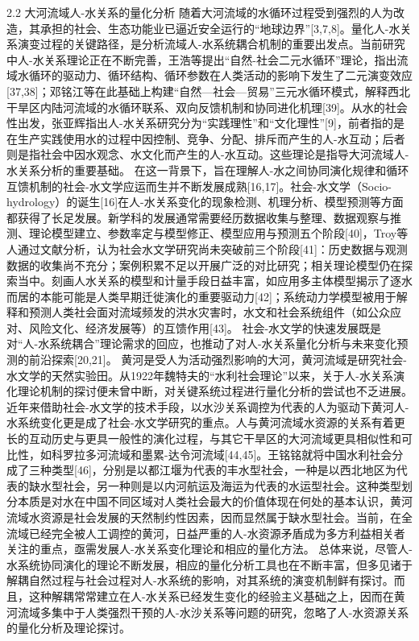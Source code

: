 2.2 大河流域人-水关系的量化分析
随着大河流域的水循环过程受到强烈的人为改造，其承担的社会、生态功能业已逼近安全运行的“地球边界”[3,7,8]。量化人-水关系演变过程的关键路径，是分析流域人-水系统耦合机制的重要出发点。当前研究中人-水关系理论正在不断完善，王浩等提出“自然-社会二元水循环”理论，指出流域水循环的驱动力、循环结构、循环参数在人类活动的影响下发生了二元演变效应[37,38]；邓铭江等在此基础上构建“自然—社会—贸易”三元水循环模式，解释西北干旱区内陆河流域的水循环联系、双向反馈机制和协同进化机理[39]。从水的社会性出发，张亚辉指出人-水关系研究分为“实践理性”和“文化理性”[9]，前者指的是在生产实践使用水的过程中因控制、竞争、分配、排斥而产生的人-水互动；后者则是指社会中因水观念、水文化而产生的人-水互动。这些理论是指导大河流域人-水关系分析的重要基础。
在这一背景下，旨在理解人-水之间协同演化规律和循环互馈机制的社会-水文学应运而生并不断发展成熟[16,17]。社会-水文学（Socio-hydrology）的诞生[16]在人-水关系变化的现象检测、机理分析、模型预测等方面都获得了长足发展。新学科的发展通常需要经历数据收集与整理、数据观察与推测、理论模型建立、参数率定与模型修正、模型应用与预测五个阶段[40]，Troy等人通过文献分析，认为社会水文学研究尚未突破前三个阶段[41]：历史数据与观测数据的收集尚不充分；案例积累不足以开展广泛的对比研究；相关理论模型仍在探索当中。刻画人水关系的模型和计量手段日益丰富，如应用多主体模型揭示了逐水而居的本能可能是人类早期迁徙演化的重要驱动力[42]；系统动力学模型被用于解释和预测人类社会面对流域频发的洪水灾害时，水文和社会系统组件（如公众应对、风险文化、经济发展等）的互馈作用[43]。 社会-水文学的快速发展既是对“人-水系统耦合”理论需求的回应，也推动了对人-水关系量化分析与未来变化预测的前沿探索[20,21]。
黄河是受人为活动强烈影响的大河，黄河流域是研究社会-水文学的天然实验田。从1922年魏特夫的“水利社会理论”以来，关于人-水关系演化理论机制的探讨便未曾中断，对关键系统过程进行量化分析的尝试也不乏进展。近年来借助社会-水文学的技术手段，以水沙关系调控为代表的人为驱动下黄河人-水系统变化更是成了社会-水文学研究的重点。人与黄河流域水资源的关系有着更长的互动历史与更具一般性的演化过程，与其它干旱区的大河流域更具相似性和可比性，如科罗拉多河流域和墨累-达令河流域[44,45]。王铭铭就将中国水利社会分成了三种类型[46]，分别是以都江堰为代表的丰水型社会，一种是以西北地区为代表的缺水型社会，另一种则是以内河航运及海运为代表的水运型社会。这种类型划分本质是对水在中国不同区域对人类社会最大的价值体现在何处的基本认识，黄河流域水资源是社会发展的天然制约性因素，因而显然属于缺水型社会。当前，在全流域已经完全被人工调控的黄河，日益严重的人-水资源矛盾成为多方利益相关者关注的重点，亟需发展人-水关系变化理论和相应的量化方法。
总体来说，尽管人-水系统协同演化的理论不断发展，相应的量化分析工具也在不断丰富，但多见诸于解耦自然过程与社会过程对人-水系统的影响，对其系统的演变机制鲜有探讨。而且，这种解耦常常建立在人-水关系已经发生变化的经验主义基础之上，因而在黄河流域多集中于人类强烈干预的人-水沙关系等问题的研究，忽略了人-水资源关系的量化分析及理论探讨。

